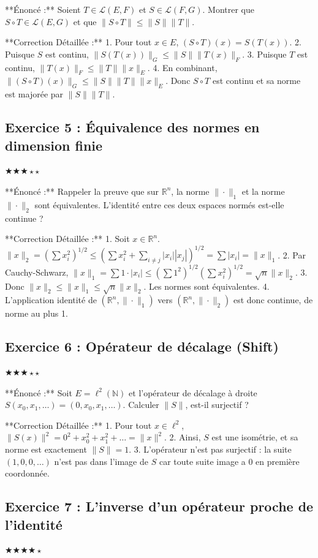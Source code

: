 \documentclass[11pt,a4paper]{article}
\begin{document}
**Énoncé :**
Soient $T \in \mathcal{L}(E,F)$ et $S \in \mathcal{L}(F,G)$. Montrer que $S \circ T \in \mathcal{L}(E,G)$ et que $\|S \circ T\| \le \|S\| \|T\|$.

**Correction Détaillée :**
1. Pour tout $x \in E$, $(S \circ T)(x) = S(T(x))$.
2. Puisque $S$ est continu, $\|S(T(x))\|_G \le \|S\| \|T(x)\|_F$.
3. Puisque $T$ est continu, $\|T(x)\|_F \le \|T\| \|x\|_E$.
4. En combinant, $\|(S \circ T)(x)\|_G \le \|S\| \|T\| \|x\|_E$. Donc $S \circ T$ est continu et sa norme est majorée par $\|S\| \|T\|$.


\subsection*{Exercice 5 : Équivalence des normes en dimension finie}
$\bigstar\bigstar\bigstar\star\star$

**Énoncé :**
Rappeler la preuve que sur $\mathbb{R}^n$, la norme $\| \cdot \|_1$ et la norme $\| \cdot \|_2$ sont équivalentes. L'identité entre ces deux espaces normés est-elle continue ?

**Correction Détaillée :**
1. Soit $x \in \mathbb{R}^n$. $\|x\|_2 = (\sum x_i^2)^{1/2} \le (\sum x_i^2 + \sum_{i \neq j} |x_i||x_j|)^{1/2} = \sum |x_i| = \|x\|_1$.
2. Par Cauchy-Schwarz, $\|x\|_1 = \sum 1 \cdot |x_i| \le (\sum 1^2)^{1/2} (\sum x_i^2)^{1/2} = \sqrt{n} \|x\|_2$.
3. Donc $\|x\|_2 \le \|x\|_1 \le \sqrt{n} \|x\|_2$. Les normes sont équivalentes.
4. L'application identité de $(\mathbb{R}^n, \|\cdot\|_1)$ vers $(\mathbb{R}^n, \|\cdot\|_2)$ est donc continue, de norme au plus 1.


\subsection*{Exercice 6 : Opérateur de décalage (Shift)}
$\bigstar\bigstar\bigstar\star\star$

**Énoncé :**
Soit $E = \ell^2(\mathbb{N})$ et l'opérateur de décalage à droite $S(x_0, x_1, \dots) = (0, x_0, x_1, \dots)$. Calculer $\|S\|$, est-il surjectif ?

**Correction Détaillée :**
1. Pour tout $x \in \ell^2$, $\|S(x)\|^2 = 0^2 + x_0^2 + x_1^2 + \dots = \|x\|^2$.
2. Ainsi, $S$ est une isométrie, et sa norme est exactement $\|S\| = 1$.
3. L'opérateur n'est pas surjectif : la suite $(1, 0, 0, \dots)$ n'est pas dans l'image de $S$ car toute suite image a 0 en première coordonnée.


\subsection*{Exercice 7 : L'inverse d'un opérateur proche de l'identité}
$\bigstar\bigstar\bigstar\bigstar\star$
\end{document}
